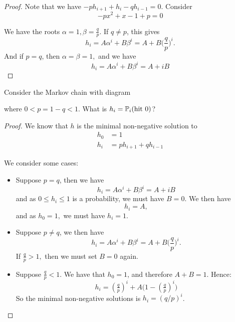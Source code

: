 \begin{proof}
Note that we have
$-ph_{i+1}+h_{i}-qh_{i-1}=0$. Consider
\[
-px^2+x-1+p=0
\]

We have the roots \(\alpha =1,\beta =\tfrac{q}{p}\). If \(q\neq p\), this gives
\[
h_{i}=A\alpha ^i+B\beta ^i=A+B\Big(\frac{q}{p}\Big)^i.
\]
And if \(p=q\), then \(\alpha =\beta =1,\) and we have
\[
h_{i}=A\alpha ^i+B\beta ^i=A+iB
\]
\(\)
\end{proof}




\begin{thm}[Example 1.3.3]
Consider the Markov chain with diagram


where \(0<p=1-q<1\). What is \(h_{i}=\Bbb{P}_{i}(\text{hit } 0)\)?
\end{thm}

\begin{proof}
We know that \(h\) is the minimal non-negative solution to
\begin{align*}
h_{0}&=1 \\
h_{i}&=ph_{i+1} +qh_{i-1}
\end{align*}

We consider some cases: 
\begin{itemize}
  \item Suppose \(p=q\), then we have
\[
h_{i}=A\alpha ^i+B\beta ^i=A+iB
\]
and as $0\leq h_{i}\leq 1$ is a probability, we must have $B=0$. We then have
\[
h_{i}=A,
\]
and as \(h_{0}=1,\) we must have $h_{i}=1$.
  \item Suppose $p\neq q$, we then have
\[
h_{i}=A\alpha ^i+B\beta ^i=A+B\Big(\frac{q}{p}\Big)^i.
\]
If \(\frac{q}{p}>1,\) then we must set $B=0$ again.
  \item Suppose \(\frac{q}{p}<1\). We have that $h_{0}=1$, and therefore \(A+B=1.\) Hence:
\[
h_{i}=(\tfrac{q}{p})^i+A\Big(1-(\tfrac{q}{p})^i\Big)
\]
So the minimal non-negative solutions is \(h_{i}=(q/p)^i\).
\end{itemize}
\end{proof}



